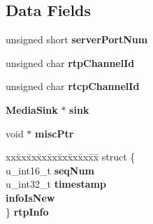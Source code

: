 \subsection*{Data Fields}
\begin{DoxyCompactItemize}
\item 
unsigned short {\bf server\+Port\+Num}
\item 
unsigned char {\bf rtp\+Channel\+Id}
\item 
unsigned char {\bf rtcp\+Channel\+Id}
\item 
{\bf Media\+Sink} $\ast$ {\bf sink}
\item 
void $\ast$ {\bf misc\+Ptr}
\item 
\begin{tabbing}
xx\=xx\=xx\=xx\=xx\=xx\=xx\=xx\=xx\=\kill
struct \{\\
\>u\_int16\_t {\bf seqNum}\\
\>u\_int32\_t {\bf timestamp}\\
 {\bf infoIsNew}\\
\} {\bf rtpInfo}\\

\end{tabbing}\end{DoxyCompactItemize}
